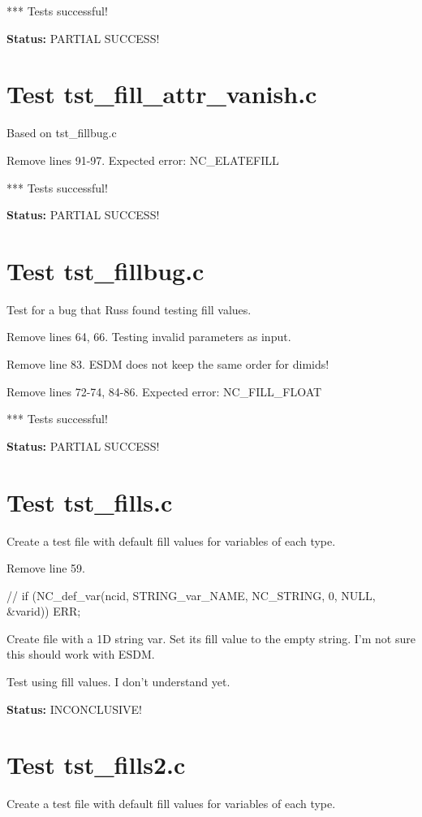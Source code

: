 *** Tests successful!

{\bf \large Status: } PARTIAL SUCCESS!

\section{Test tst\_fill\_attr\_vanish.c}

Based on tst\_fillbug.c

Remove lines 91-97. Expected error: NC\_ELATEFILL

*** Tests successful!

{\bf \large Status: } PARTIAL SUCCESS!

\section{Test tst\_fillbug.c}

Test for a bug that Russ found testing fill values.

Remove lines 64, 66. Testing invalid parameters as input.

Remove line 83. ESDM does not keep the same order for dimids!

Remove lines 72-74, 84-86. Expected error: NC\_FILL\_FLOAT

*** Tests successful!

{\bf \large Status: } PARTIAL SUCCESS!

\section{Test tst\_fills.c}

Create a test file with default fill values for variables of each type.

Remove line 59.

// if (NC\_def\_var(ncid, STRING\_var\_NAME, NC\_STRING, 0, NULL, \&varid)) ERR;

Create file with a 1D string var. Set its fill value to the empty string.
I'm not sure this should work with ESDM.

Test using fill values. I don't understand yet.

{\bf \large Status: } INCONCLUSIVE!

\section{Test tst\_fills2.c}

Create a test file with default fill values for variables of each type.

